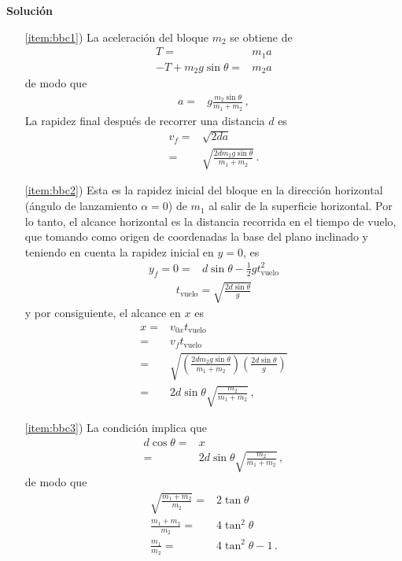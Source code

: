 \textbf{Solución}
  \begin{itemize}
  \item[\ref{item:bbc1})] La aceleración del bloque $m_2$ se obtiene de
    \begin{align}
      T=&m_1 a \nonumber\\
      -T+m_2g\sin\theta=&m_2 a
    \end{align}
de modo que
\begin{align}
  a=&g\frac{m_2\sin\theta}{m_1+m_2}\,,
\end{align}
La rapidez final después de recorrer una distancia $d$ es
\begin{align}
  v_f=&\sqrt{2da}\nonumber\\
   =&\sqrt{\frac{2dm_2g\sin\theta}{m_1+m_2}}\,.
\end{align}
\item[\ref{item:bbc2})] Esta es la rapidez inicial del bloque en la
  dirección horizontal (ángulo de lanzamiento $\alpha=0$) de $m_1$ al
  salir de la superficie horizontal.
  Por lo tanto, el alcance horizontal es la distancia recorrida en el
  tiempo de vuelo, que tomando como origen de coordenadas la base del
  plano inclinado y teniendo en cuenta la rapidez inicial en $y=0$, es
\begin{align}
 y_{f}=0=&d\sin\theta-\frac{1}{2}g t_{\text{vuelo}}^2
\end{align}
\begin{align}
  t_{\text{vuelo}}=\sqrt{\frac{2d\sin\theta}{g}}
\end{align}
y por consiguiente, el alcance en $x$ es
\begin{align}
  x=&v_{0x}t_{\text{vuelo}}\nonumber\\
   =&v_f t_{\text{vuelo}}\nonumber\\
   =&\sqrt{\left(\frac{2dm_2g\sin\theta}{m_1+m_2}\right)\left(\frac{2d\sin\theta}{g}\right)}\nonumber\\
   =&2d\sin\theta\sqrt{\frac{m_2}{m_1+m_2}}\,,
\end{align}
\item[\ref{item:bbc3})] La condición implica que
  \begin{align}
    d\cos\theta=&x \nonumber\\
               =&2d\sin\theta\sqrt{\frac{m_2}{m_1+m_2}}\,,
  \end{align}
de modo que
\begin{align}
\sqrt{\frac{m_1+m_2}{m_2}}=&2\tan\theta \nonumber\\
\frac{m_1+m_2}{m_2}=&4\tan^2\theta \nonumber\\
\frac{m_1}{m_2}=&4\tan^2\theta-1\,.
\end{align}


  \end{itemize}
    





